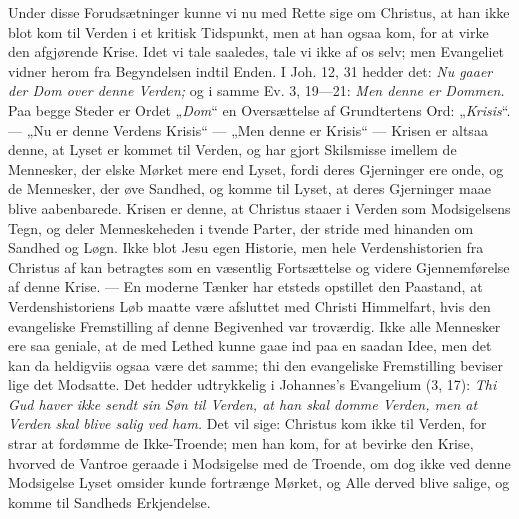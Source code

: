 \documentclass[12pt,a4paper]{book}
\begin{document}
Under disse Forudsætninger kunne vi nu med Rette sige om Christus, at han ikke blot kom
til Verden i et kritisk Tidspunkt,
men at han ogsaa kom, for at virke den afgjørende Krise. Idet vi tale saaledes, tale vi
ikke af os selv; men Evangeliet vidner herom fra Begyndelsen indtil Enden. I Joh. 12, 31
hedder det: \emph{Nu gaaer der Dom over denne Verden;} og i samme Ev. 3, 19---21:
\emph{Men denne er Dommen.} Paa begge Steder er Ordet „\emph{Dom}“ en Oversættelse af
Grundtertens Ord: „\emph{Krisis}“. --- „Nu er denne Verdens Krisis“ --- „Men denne er
Krisis“ --- Krisen er altsaa denne, at Lyset er kommet til Verden, og har gjort
Skilsmisse imellem de Mennesker, der elske Mørket mere end Lyset, fordi deres
Gjerninger ere onde, og de Mennesker, der øve Sandhed, og komme til Lyset, at deres
Gjerninger maae blive aabenbarede. Krisen er denne, at Christus staaer i Verden som
Modsigelsens Tegn, og deler Menneskeheden i tvende Parter, der stride med hinanden om
Sandhed og Løgn. Ikke blot Jesu egen Historie, men hele Verdenshistorien fra Christus af
kan betragtes som en væsentlig Fortsættelse og videre Gjennemførelse af denne Krise. ---
En moderne Tænker har etsteds opstillet den Paastand, at Verdenshistoriens Løb maatte
være afsluttet med Christi Himmelfart, hvis den evangeliske Fremstilling af denne
Begivenhed var troværdig. Ikke alle Mennesker ere saa geniale, at de med Lethed kunne
gaae ind paa en saadan Idee, men det kan da heldigviis ogsaa være det samme; thi den
evangeliske Fremstilling beviser lige det Modsatte. Det hedder udtrykkelig i Johannes's
Evangelium (3, 17): \emph{Thi Gud haver ikke sendt sin Søn til Verden, at han skal domme
Verden, men at Verden skal blive salig ved ham.} Det vil sige: Christus kom ikke til
Verden, for strar at fordømme de Ikke-Troende; men han kom, for at bevirke den Krise,
hvorved de Vantroe geraade i Modsigelse med de Troende, om dog ikke ved denne Modsigelse
Lyset omsider kunde fortrænge Mørket, og Alle derved blive salige, og komme til
Sandheds Erkjendelse.
\end{document}
